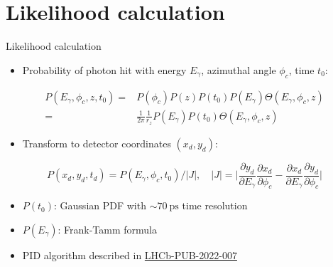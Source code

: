 \documentclass{beamer}
\begin{document}
\section{Likelihood calculation}
\begin{frame}{Likelihood calculation}
  \begin{itemize}
    \item{Probability of photon hit with energy $E_\gamma$, azimuthal angle $\phi_c$, time $t_0$:}
  \end{itemize}
  \begin{align*}
    P(E_\gamma, \phi_c, z, t_0) =& P(\phi_c)P(z)P(t_0)P(E_\gamma)\Theta(E_\gamma, \phi_c, z) \\
    =& \frac{1}{2\pi}\frac{1}{r_z}P(E_\gamma)P(t_0)\Theta(E_\gamma, \phi_c, z)
  \end{align*}
  \begin{itemize}
    \item{Transform to detector coordinates $(x_d, y_d)$:}
  \end{itemize}
  \begin{equation*}
    P(x_d, y_d, t_d) = P(E_\gamma, \phi_c, t_0)/\lvert J\rvert, \quad \lvert J\rvert = \Big\lvert\frac{\partial y_d}{\partial E_\gamma}\frac{\partial x_d}{\partial\phi_c} - \frac{\partial x_d}{\partial E_\gamma}\frac{\partial y_d}{\partial\phi_c}\Big\rvert
  \end{equation*}
  \begin{itemize}
    \item{$P(t_0)$: Gaussian PDF with $\sim\SI{70}{\pico\second}$ time resolution}
    \item{$P(E_\gamma)$: Frank-Tamm formula}
  \end{itemize}
  \begin{itemize}
    \item{PID algorithm described in \href{https://www.overleaf.com/project/5d0b9c5a5005405666aacd05}{LHCb-PUB-2022-007}}
  \end{itemize}
\end{frame}
\end{document}
